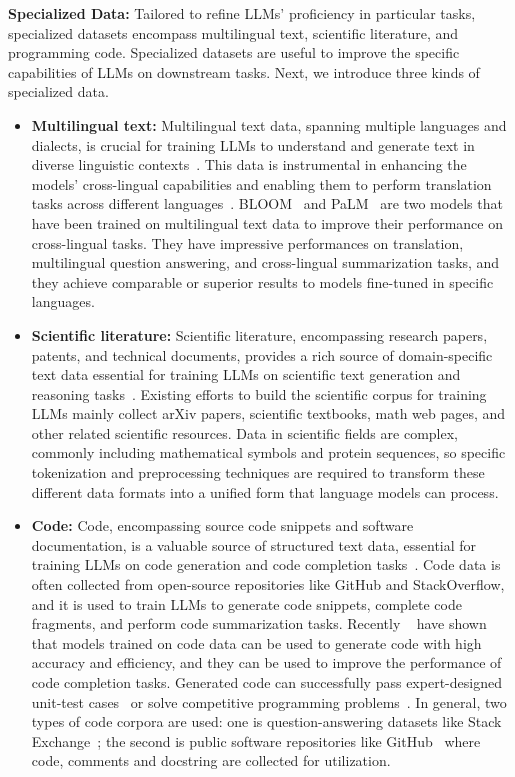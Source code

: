 \textbf{Specialized Data:} Tailored to refine LLMs' proficiency in particular tasks, specialized datasets encompass multilingual text, scientific literature, and programming code.
Specialized datasets are useful to improve the specific capabilities of LLMs on downstream tasks.
Next, we introduce three kinds of specialized data.
\begin{itemize}
	\item \textbf{Multilingual text:} {
		      Multilingual text data, spanning multiple languages and dialects, is crucial for training LLMs to understand and generate text in diverse linguistic contexts~\cite{survey}. This data is instrumental in enhancing the models' cross-lingual capabilities and enabling them to perform translation tasks across different languages~\cite{survey}.
		      BLOOM~\cite{workshop2023bloom} and PaLM~\cite{chowdhery2022palm} are two models that have been trained on multilingual text data to improve their performance on cross-lingual tasks. They have impressive performances on translation, multilingual question answering, and cross-lingual summarization tasks, and they achieve comparable or superior results to models fine-tuned in specific languages.
	      }
	\item \textbf{Scientific literature:} {
		      Scientific literature, encompassing research papers, patents, and technical documents, provides a rich source of domain-specific text data essential for training LLMs on scientific text generation and reasoning tasks~\cite{survey, taylor2022galactica, lewkowycz2022minerva}.
		      Existing efforts to build the scientific corpus for training LLMs mainly collect arXiv papers, scientific textbooks, math web pages, and other related scientific resources.
		      Data in scientific fields are complex, commonly including mathematical symbols and protein sequences, so specific tokenization and preprocessing techniques are required to transform these different data formats into a unified form that language models can process.
	      }
	\item \textbf{Code:} {
		      Code, encompassing source code snippets and software documentation, is a valuable source of structured text data, essential for training LLMs on code generation and code completion tasks~\cite{survey, nijkamp2022codegen}.
		      Code data is often collected from open-source repositories like GitHub and StackOverflow, and it is used to train LLMs to generate code snippets, complete code fragments, and perform code summarization tasks.
		      Recently ~\textcite{chen2021evaluating, austin2021program} have shown that models trained on code data can be used to generate code with high accuracy and efficiency, and they can be used to improve the performance of code completion tasks. Generated code can successfully pass expert-designed unit-test cases~\cite{chen2021evaluating} or solve competitive programming problems~\cite{li2022competition}.
		      In general, two types of code corpora are used: one is question-answering datasets like Stack Exchange~\cite{xu2022systematic}; the second is public software repositories like GitHub~\cite{chen2021evaluating} where code, comments and docstring are collected for utilization.
	      }
\end{itemize}

